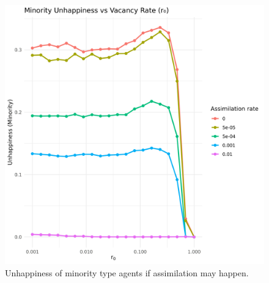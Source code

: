 \begin{figure}
    \centering
    \includegraphics[width=0.5\linewidth]{images/segregation_plot_assimilation.png}
    \caption{Unhappiness of minority type agents if assimilation may happen.}
    \label{fig:assimilation}
\end{figure}